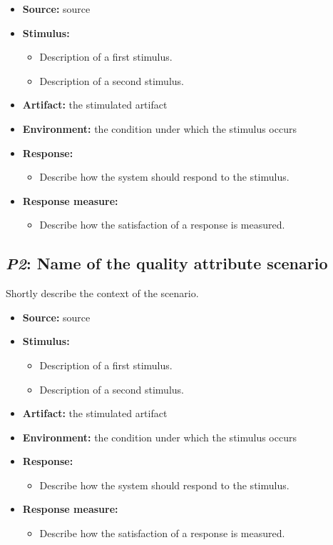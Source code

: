 \documentclass[english]{sareport}
\begin{document}
\begin{itemize}
    \item \textbf{Source:} source
    \item \textbf{Stimulus:}
        \begin{itemize}
            \item Description of a first stimulus.
            \item Description of a second stimulus.
        \end{itemize}

    \item \textbf{Artifact:} the stimulated artifact
    \item \textbf{Environment:} the condition under which the stimulus occurs
    \item \textbf{Response:}
        \begin{itemize}
            \item Describe how the system should respond to the stimulus.
        \end{itemize}

    \item \textbf{Response measure:}
        \begin{itemize}
            \item Describe how the satisfaction of a response is measured.
        \end{itemize}
\end{itemize}

\subsection{\emph{P2}: Name of the quality attribute scenario}
Shortly describe the context of the scenario.

\begin{itemize}
    \item \textbf{Source:} source
    \item \textbf{Stimulus:}
        \begin{itemize}
            \item Description of a first stimulus.
            \item Description of a second stimulus.
        \end{itemize}

    \item \textbf{Artifact:} the stimulated artifact
    \item \textbf{Environment:} the condition under which the stimulus occurs
    \item \textbf{Response:}
        \begin{itemize}
            \item Describe how the system should respond to the stimulus.
        \end{itemize}

    \item \textbf{Response measure:}
        \begin{itemize}
            \item Describe how the satisfaction of a response is measured.
        \end{itemize}
\end{itemize}
\end{document}
